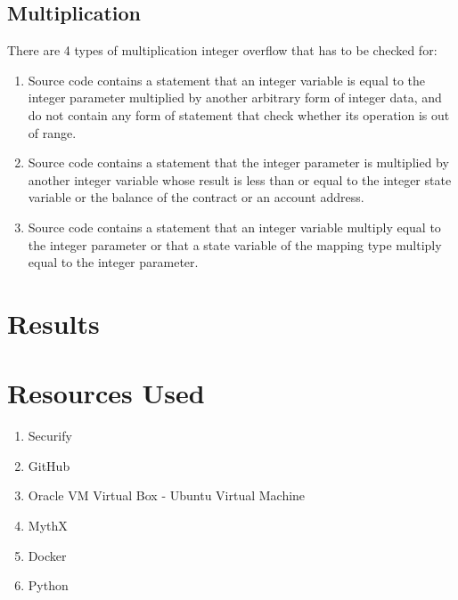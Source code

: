 \documentclass{article}
\begin{document}
\subsection{Multiplication}
There are 4 types of multiplication integer overflow that has to be checked for:
\begin{enumerate}
    \item Source code contains a statement that an integer variable is equal to the integer parameter multiplied by another arbitrary form of integer data, and do not contain any form of statement that check whether its operation is out of range.
    \item Source code contains a statement that the integer parameter is multiplied by another integer variable whose result is less than or equal to the integer state variable or the balance of the contract or an account address.
    \item Source code contains a statement that an integer variable multiply equal to the integer parameter or that a state variable of the mapping type multiply equal to the integer parameter.
\end{enumerate}

\section{Results}



\section{Resources Used}
\begin{enumerate}
    \item Securify \cite{SecurifyGH}
    \item GitHub
    \item Oracle VM Virtual Box - Ubuntu Virtual Machine \cite{VirtualBox}
    \item MythX \cite{MythX}
    \item Docker \cite{Docker}
    \item Python 
\end{enumerate}

\printbibliography
\end{document}
